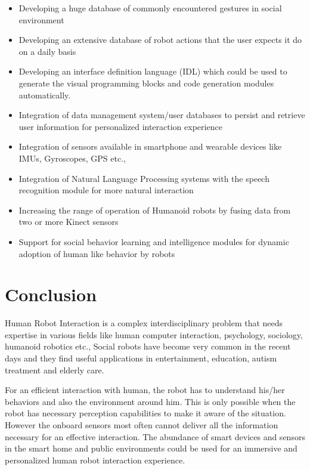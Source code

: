 \begin{itemize}
\item Developing a huge database of commonly encountered gestures in social environment
\item Developing an extensive database of robot actions that the user expects it do on a daily basis
\item Developing an interface definition language (IDL) which could be used to generate the visual programming blocks and code generation modules automatically.
\item Integration of data management system/user databases to persist and retrieve user information for personalized interaction experience
\item Integration of sensors available in smartphone and wearable devices like IMUs, Gyroscopes, GPS etc.,
\item Integration of Natural Language Processing systems with the speech recognition module for more natural interaction
\item Increasing the range of operation of Humanoid robots by fusing data from two or more Kinect sensors 
\item Support for social behavior learning and intelligence modules for dynamic adoption of human like behavior by robots
\end{itemize}

\section{Conclusion} %
Human Robot Interaction is a complex interdisciplinary problem that needs expertise in various fields like human computer interaction, psychology, sociology, humanoid robotics etc., Social robots have become very common in the recent days and they find useful applications in entertainment, education, autism treatment and elderly care. 

For an efficient interaction with human, the robot has to understand his/her behaviors and also the environment around him. This is only possible when the robot has necessary perception capabilities to make it aware of the situation. However the onboard sensors most often cannot deliver all the information necessary for an effective interaction. The abundance of smart devices and sensors in the smart home and public environments could be used for an immersive and personalized human robot interaction experience. 


